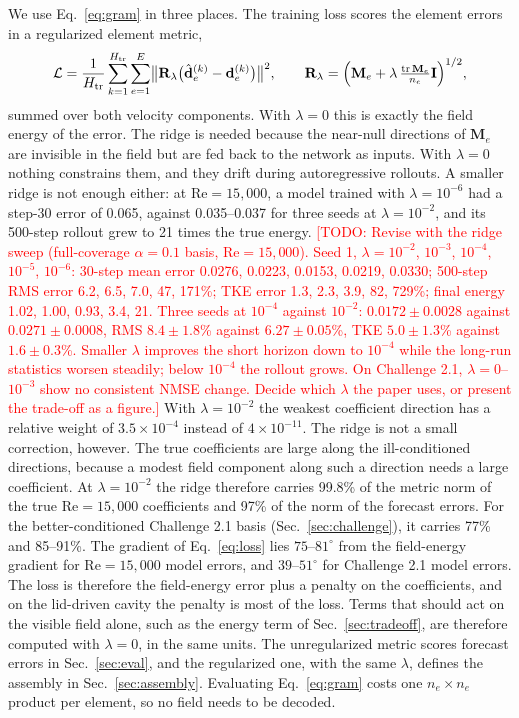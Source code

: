\documentclass[conf]{new-aiaa}
\newcommand{\todo}[1]{\textcolor{red}{[TODO: #1]}}
\newcommand{\Rey}{\mathrm{Re}}
\newcommand{\dvec}{\mathbf{d}}
\newcommand{\dhat}{\hat{\mathbf{d}}}
\begin{document}
We use Eq.~\eqref{eq:gram} in three places. The training loss scores the element errors in a regularized element metric,
\begin{equation}
  \mathcal{L}=\frac{1}{H_\mathrm{tr}}\sum_{k=1}^{H_\mathrm{tr}}\sum_{e=1}^{E}\bigl\|\mathbf{R}_\lambda\bigl(\dhat_e^{(k)}-\dvec_e^{(k)}\bigr)\bigr\|^2,\qquad
  \mathbf{R}_\lambda=\Bigl(\mathbf{M}_e+\lambda\,\tfrac{\operatorname{tr}\mathbf{M}_e}{n_e}\mathbf{I}\Bigr)^{1/2},
  \label{eq:loss}
\end{equation}
summed over both velocity components. With $\lambda=0$ this is exactly the field energy of the error. The ridge is needed because the near-null directions of $\mathbf{M}_e$ are invisible in the field but are fed back to the network as inputs. With $\lambda=0$ nothing constrains them, and they drift during autoregressive rollouts. A smaller ridge is not enough either: at $\Rey=15{,}000$, a model trained with $\lambda=10^{-6}$ had a step-30 error of 0.065, against 0.035--0.037 for three seeds at $\lambda=10^{-2}$, and its 500-step rollout grew to 21 times the true energy. \todo{Revise with the ridge sweep (full-coverage $\alpha=0.1$ basis, $\Rey=15{,}000$). Seed 1, $\lambda=10^{-2}$, $10^{-3}$, $10^{-4}$, $10^{-5}$, $10^{-6}$: 30-step mean error 0.0276, 0.0223, 0.0153, 0.0219, 0.0330; 500-step RMS error 6.2, 6.5, 7.0, 47, 171\%; TKE error 1.3, 2.3, 3.9, 82, 729\%; final energy 1.02, 1.00, 0.93, 3.4, 21. Three seeds at $10^{-4}$ against $10^{-2}$: $0.0172\pm0.0028$ against $0.0271\pm0.0008$, RMS $8.4\pm1.8$\% against $6.27\pm0.05$\%, TKE $5.0\pm1.3$\% against $1.6\pm0.3$\%. Smaller $\lambda$ improves the short horizon down to $10^{-4}$ while the long-run statistics worsen steadily; below $10^{-4}$ the rollout grows. On Challenge 2.1, $\lambda=0$--$10^{-3}$ show no consistent NMSE change. Decide which $\lambda$ the paper uses, or present the trade-off as a figure.} With $\lambda=10^{-2}$ the weakest coefficient direction has a relative weight of $3.5\times10^{-4}$ instead of $4\times10^{-11}$.
The ridge is not a small correction, however. The true coefficients are large along the ill-conditioned directions, because a modest field component along such a direction needs a large coefficient. At $\lambda=10^{-2}$ the ridge therefore carries 99.8\% of the metric norm of the true $\Rey=15{,}000$ coefficients and 97\% of the norm of the forecast errors. For the better-conditioned Challenge 2.1 basis (Sec.~\ref{sec:challenge}), it carries 77\% and 85--91\%. The gradient of Eq.~\eqref{eq:loss} lies $75$--$81^\circ$ from the field-energy gradient for $\Rey=15{,}000$ model errors, and $39$--$51^\circ$ for Challenge 2.1 model errors. The loss is therefore the field-energy error plus a penalty on the coefficients, and on the lid-driven cavity the penalty is most of the loss. Terms that should act on the visible field alone, such as the energy term of Sec.~\ref{sec:tradeoff}, are therefore computed with $\lambda=0$, in the same units. The unregularized metric scores forecast errors in Sec.~\ref{sec:eval}, and the regularized one, with the same $\lambda$, defines the assembly in Sec.~\ref{sec:assembly}. Evaluating Eq.~\eqref{eq:gram} costs one $n_e\times n_e$ product per element, so no field needs to be decoded.
\end{document}
